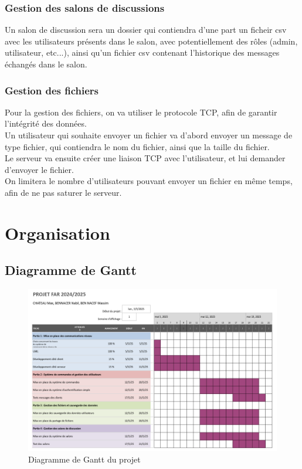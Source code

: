\documentclass{cs-moi}
\begin{document}
\subsubsection{Gestion des salons de discussions}
Un salon de discussion sera un dossier qui contiendra d'une part un ficheir csv avec les utilisateurs présents dans le salon, avec potentiellement des rôles (admin, utilisateur, etc...), ainsi qu'un fichier csv contenant l'historique des messages échangés dans le salon.\\

\subsubsection{Gestion des fichiers}
Pour la gestion des fichiers, on va utiliser le protocole TCP, afin de garantir l'intégrité des données.\\
Un utilisateur qui souhaite envoyer un fichier va d'abord envoyer un message de type fichier, qui contiendra le nom du fichier, ainsi que la taille du fichier.\\
Le serveur va ensuite créer une liaison TCP avec l'utilisateur, et lui demander d'envoyer le fichier.\\
On limitera le nombre d'utilisateurs pouvant envoyer un fichier en même temps, afin de ne pas saturer le serveur.\\

\newpage
\section{Organisation}
\subsection{Diagramme de Gantt}
\begin{figure}[h!]
    \centering
    \includegraphics[width=0.95\linewidth]{Gantt.png}
    \caption{Diagramme de Gantt du projet}
\end{figure}
\end{document}
